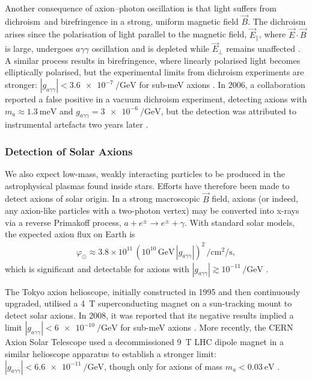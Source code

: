Another consequence of axion--photon oscillation is that light suffers from dichroism\footnotemark\ and birefringence in a strong, uniform magnetic field $\vec B$.
The dichroism arises since the polarisation of light parallel to the magnetic field, $\vec E_\parallel$, where $\vec E \cdot \vec B$ is large, undergoes $aγγ$ oscillation and is depleted while $\vec E_\perp$ remains unaffected \cite[§\,91.3.2]{ParticleDataGroup-review-2020}.
A similar process results in birefringence, where linearly polarised light becomes elliptically polarised, but the experimental limits from dichroism experiments are stronger: $|g_{aγγ}| < \SI{3.6e-7}{\per\giga\eV}$ for sub-\si{\milli\eV} axions \cite{axion_dichromism}.
In 2006, a collaboration reported a false positive in a vacuum dichroism experiment, detecting axions with $m_a \approx \SI{1.3}{\milli\eV}$ and $g_{aγγ} = \SI{3e-6}{\per\giga\eV}$, but the detection was attributed to instrumental artefacts two years later \cite{birefringence_false_positive_2008}.






\subsubsection{Detection of Solar Axions}

We also expect low-mass, weakly interacting particles to be produced in the astrophysical plasmas found inside stars.
Efforts have therefore been made to detect axions of solar origin.
In a strong macroscopic $\vec B$ field, axions (or indeed, any axion-like particles with a two-photon vertex) may be converted into x-rays via a reverse Primakoff process, $a + e^\pm \to e^\pm + γ$.
With standard solar models, the expected axion flux on Earth is
\begin{align}
	φ_\odot \approx 3.8\times10^{11}\,(10^{10}\,\si{\giga\eV}\,|g_{aγγ}|)^2\,\si{\per\square\cm\per\s}
,\end{align}
which is significant and detectable for axions with $|g_{aγγ}| \gtrsim 10^{-11}\,\si{\per\giga\eV}$ \cite{solar-axion-flux_2007}.

The Tokyo axion helioscope, initially constructed in 1995 and then continuously upgraded, utilised a \SI{4}{\tesla} superconducting magnet on a sun-tracking mount to detect solar axions.
In 2008, it was reported that its negative results implied a limit $|g_{aγγ}| < \SI{6e-10}{\per\giga\eV}$ for sub-\si{\milli\eV} axions \cite{Tokyo-axion-helioscope_2008}.
More recently, the CERN Axion Solar Telescope used a decommissioned \SI{9}{\tesla} LHC dipole magnet in a similar helioscope apparatus to establish a stronger limit: $|g_{aγγ}| < \SI{6.6e-11}{\per\giga\eV}$, though only for axions of mass $m_a < \SI{0.03}{\eV}$ \cite{CAST-helioscope_2017}.


